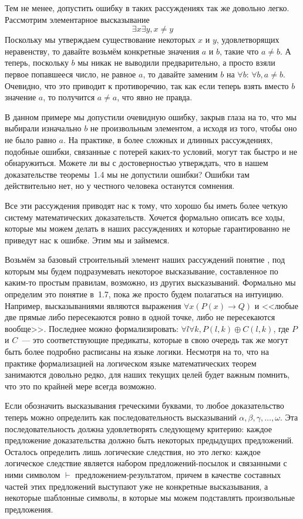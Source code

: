 Тем не менее, допустить ошибку в таких рассуждениях так же довольно легко. Рассмотрим элементарное высказывание $$\exists x \exists y, x\not= y$$
Поскольку мы утверждаем существование некоторых $x$ и $y$, удовлетворящих неравенству, то давайте возьмём конкретные значения $a$ и $b$, такие что $a\not= b$. А теперь, поскольку $b$ мы никак не выводили предварительно, а просто взяли первое попавшееся число, не равное $a$, то давайте заменим $b$ на $\forall b$: $\forall b, a\not= b$. Очевидно, что это приводит к противоречию, так как если теперь взять вместо $b$ значение $a$, то получится $a\not= a$, что явно не правда.

В данном примере мы допустили очевидную ошибку, закрыв глаза на то, что мы выбирали изначально $b$ не произвольным элементом, а исходя из того, чтобы оно не было равно $a$. На практике, в более сложных и длинных рассуждениях, подобные ошибки, связанные с потерей каких-то условий, могут так быстро и не обнаружиться. Можете ли вы с достоверностью утверждать, что в нашем доказательстве теоремы~1.4 мы не допустили ошибки? Ошибки там действительно нет, но у честного человека останутся сомнения.

Все эти рассуждения приводят нас к тому, что хорошо бы иметь более четкую систему математических доказательств. Хочется формально описать все ходы, которые мы можем делать в наших рассуждениях и которые гарантированно не приведут нас к ошибке. Этим мы и займемся.

Возьмём за базовый строительный элемент наших рассуждений понятие , под которым мы будем подразумевать некоторое высказывание, составленное по каким-то простым правилам, возможно, из других высказываний. Формально мы определим это понятие в~1.7, пока же просто будем полагаться на интуицию. Например, высказываниями являются выражения $\forall x (P(x)\to Q)$ и <<любые две прямые либо пересекаются ровно в одной точке, либо не пересекаются вообще>>. Последнее можно формализировать: $\forall l \forall k, P(l, k) \oplus C(l, k)$, где $P$ и $C$~--- это соответствующие предикаты, которые в свою очередь так же могут быть более подробно расписаны на языке логики. Несмотря на то, что на практике формализацией на логическом языке математических теорем занимаются довольно редко, для наших текущих целей будет важным помнить, что это по крайней мере всегда возможно.

Если обозначить высказывания греческими буквами, то любое доказательство теперь можно определить как последовательность высказываний $\alpha, \beta, \gamma, \ldots, \omega$. Эта последовательность должна удовлетворять следующему критерию: каждое предложение доказательства должно быть  некоторых предыдущих предложений. Осталось определить лишь логические следствия, но это легко: каждое логическое следствие является набором предложений-посылок и связанными с ними символом $\vdash$ предложением-результатом, причем в качестве составных частей этих предложений выступают уже не конкретные высказывания, а некоторые шаблонные символы, в которые мы можем подставлять произвольные предложения.

